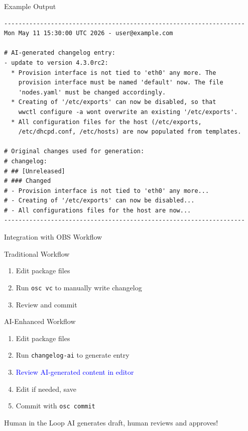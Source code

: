 \begin{frame}[fragile]{Example Output}
\begin{lstlisting}[basicstyle=\ttfamily\tiny]
-------------------------------------------------------------------
Mon May 11 15:30:00 UTC 2026 - user@example.com

# AI-generated changelog entry:
- update to version 4.3.0rc2:
  * Provision interface is not tied to 'eth0' any more. The
    provision interface must be named 'default' now. The file
    'nodes.yaml' must be changed accordingly.
  * Creating of '/etc/exports' can now be disabled, so that
    wwctl configure -a wont overwrite an existing '/etc/exports'.
  * All configuration files for the host (/etc/exports,
    /etc/dhcpd.conf, /etc/hosts) are now populated from templates.

# Original changes used for generation:
# changelog:
# ## [Unreleased]
# ### Changed
# - Provision interface is not tied to 'eth0' any more...
# - Creating of '/etc/exports' can now be disabled...
# - All configurations files for the host are now...
-------------------------------------------------------------------
\end{lstlisting}
\end{frame}

\begin{frame}{Integration with OBS Workflow}
\begin{block}{Traditional Workflow}
\begin{enumerate}
  \item Edit package files
  \item Run \texttt{osc vc} to manually write changelog
  \item Review and commit
\end{enumerate}
\end{block}

\begin{block}{AI-Enhanced Workflow}
\begin{enumerate}
  \item Edit package files
  \item Run \texttt{changelog-ai} to generate entry
  \item \textcolor{blue}{Review AI-generated content in editor}
  \item Edit if needed, save
  \item Commit with \texttt{osc commit}
\end{enumerate}
\end{block}

\begin{alertblock}{Human in the Loop}
AI generates draft, human reviews and approves!
\end{alertblock}
\end{frame}

